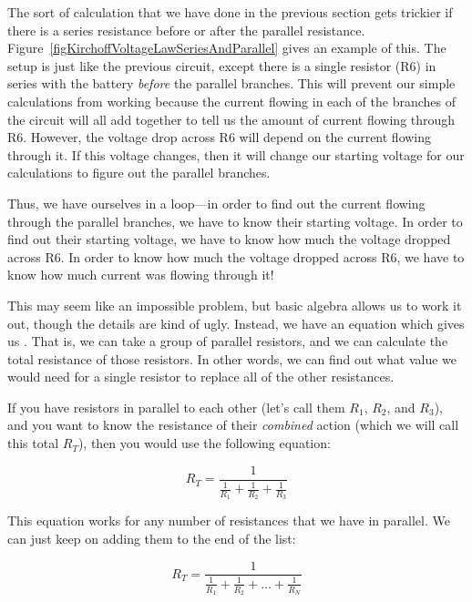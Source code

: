 The sort of calculation that we have done in the previous section gets trickier if there is a series resistance before or after the parallel resistance.
Figure~\ref{figKirchoffVoltageLawSeriesAndParallel} gives an example of this.
The setup is just like the previous circuit, except there is a single resistor (R6) in series with the battery \emph{before} the parallel branches.
This will prevent our simple calculations from working because the current flowing in each of the branches of the circuit will all add together to tell us the amount of current flowing through R6.
However, the voltage drop across R6 will depend on the current flowing through it.
If this voltage changes, then it will change our starting voltage for our calculations to figure out the parallel branches.


Thus, we have ourselves in a loop---in order to find out the current flowing through the parallel branches, we have to know their starting voltage.
In order to find out their starting voltage, we have to know how much the voltage dropped across R6.
In order to know how much the voltage dropped across R6, we have to know how much current was flowing through it!

This may seem like an impossible problem, but basic algebra allows us to work it out, though the details are kind of ugly.
Instead, we have an equation which gives us .
That is, we can take a group of parallel resistors, and we can calculate the total resistance of those resistors.
In other words, we can find out what value we would need for a single resistor to replace all of the other resistances.

If you have resistors in parallel to each other (let's call them $R_1$, $R_2$, and $R_3$), and you want to know the resistance of their \emph{combined} action (which we will call this total $R_T$), then you would use the following equation:

\begin{equation}
\label{eqparallelresistancethree}
R_T = \frac{1}{\frac{1}{R_1} + \frac{1}{R_2} + \frac{1}{R_3}}
\end{equation}

This equation works for any number of resistances that we have in parallel.
We can just keep on adding them to the end of the list:

\begin{equation}
\label{eqparallelresistancen}
R_T = \frac{1}{\frac{1}{R_1} + \frac{1}{R_2} + \ldots + \frac{1}{R_N}}
\end{equation}


